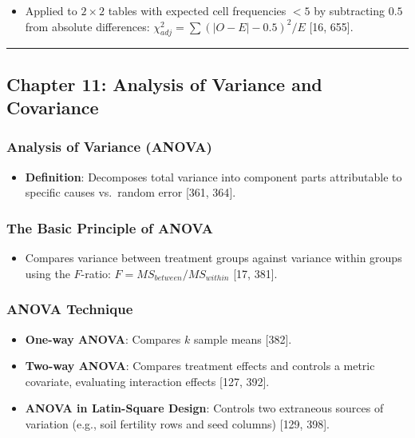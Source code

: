\documentclass[
]{article}
\providecommand{\tightlist}{%
  \setlength{\itemsep}{0pt}\setlength{\parskip}{0pt}}
\begin{document}
\begin{itemize}
\tightlist
\item
  Applied to \(2 \times 2\) tables with expected cell frequencies
  \(< 5\) by subtracting \(0.5\) from absolute differences:
  \(\chi^2_{adj} = \sum (|O - E| - 0.5)^2 / E\) {[}16, 655{]}.
\end{itemize}

\begin{center}\rule{0.5\linewidth}{0.5pt}\end{center}

\subsection{Chapter 11: Analysis of Variance and
Covariance}\label{chapter-11-analysis-of-variance-and-covariance}

\subsubsection{Analysis of Variance
(ANOVA)}\label{analysis-of-variance-anova}

\begin{itemize}
\tightlist
\item
  \textbf{Definition}: Decomposes total variance into component parts
  attributable to specific causes vs.~random error {[}361, 364{]}.
\end{itemize}

\subsubsection{The Basic Principle of
ANOVA}\label{the-basic-principle-of-anova}

\begin{itemize}
\tightlist
\item
  Compares variance between treatment groups against variance within
  groups using the \(F\)-ratio: \(F = MS_{between} / MS_{within}\)
  {[}17, 381{]}.
\end{itemize}

\subsubsection{ANOVA Technique}\label{anova-technique}

\begin{itemize}
\tightlist
\item
  \textbf{One-way ANOVA}: Compares \(k\) sample means {[}382{]}.
\item
  \textbf{Two-way ANOVA}: Compares treatment effects and controls a
  metric covariate, evaluating interaction effects {[}127, 392{]}.
\item
  \textbf{ANOVA in Latin-Square Design}: Controls two extraneous sources
  of variation (e.g., soil fertility rows and seed columns) {[}129,
  398{]}.
\end{itemize}
\end{document}
